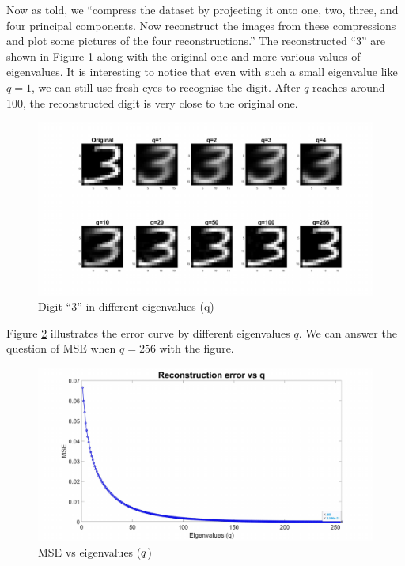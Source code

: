 \documentclass{article}
\begin{document}
Now as told, we ``compress the dataset by projecting it onto one, two, three, and four principal components. Now reconstruct the images
from these compressions and plot some pictures of the four reconstructions.'' The reconstructed ``3'' are shown in Figure \ref{fig:3indiffq} along with the original one and more various values of eigenvalues. It is interesting to notice that even with such a small eigenvalue like $q=1$, we can still use fresh eyes to recognise the digit. After $q$ reaches around 100, the reconstructed digit is very close to the original one.

\begin{figure}[h!]
  \centering
  \includegraphics[width=\textwidth]{lab3/3indiffq.pdf}
  \caption{Digit ``3'' in different eigenvalues (q)}
  \label{fig:3indiffq}
\end{figure}

Figure \ref{fig:msevsq} illustrates the error curve by different eigenvalues $q$. We can answer the question of MSE when $q=256$ with the figure.

\begin{figure}[h!]
  \centering
  \includegraphics[width=\textwidth]{lab3/msevsq.pdf}
  \caption{MSE vs eigenvalues ($\protect q$)}
  \label{fig:msevsq}
\end{figure}
\end{document}
